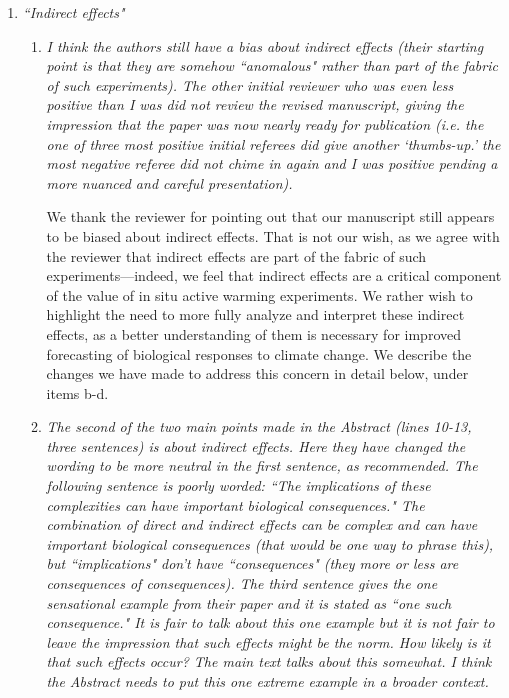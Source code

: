 \documentclass[11pt,a4paper]{letter}
\begin{document}
\begin{letter}{}
\begin{enumerate}
\begin{enumerate}
\end{enumerate}
\item \emph{``Indirect effects"}
\begin{enumerate}
\item \emph{ I think the authors still have a bias about indirect effects (their starting
point is that they are somehow ``anomalous" rather than part of the
fabric of such experiments). The other initial reviewer who was even
less positive than I was did not review the revised manuscript, giving the
impression that the paper was now nearly ready for publication (i.e. the
one of three most positive initial referees did give another `thumbs-up.'
the most negative referee did not chime in again and I was positive
pending a more nuanced and careful presentation).}

\par We thank the reviewer for pointing out that our manuscript still appears to be biased about indirect effects. That is not our wish, as we agree with the reviewer that indirect effects are part of the fabric of such experiments---indeed, we feel that indirect effects are a critical component of the value of in situ active  warming experiments. 
We rather wish to highlight the need to more fully analyze and interpret these indirect effects, as a better understanding of them is necessary for improved forecasting of biological responses to climate change. We describe the changes we have made to address this concern in detail below, under items b-d.

\item \emph{The second of the two main points made in the Abstract (lines 10-13,
three sentences) is about indirect effects. Here they have changed the
wording to be more neutral in the first sentence, as recommended. The
following sentence is poorly worded: ``The implications of these
complexities can have important biological consequences." The
combination of direct and indirect effects can be complex and can have
important biological consequences (that would be one way to phrase
this), but ``implications" don't have ``consequences" (they more or less
are consequences of consequences). The third sentence gives the one
sensational example from their paper and it is stated as ``one such
consequence." It is fair to talk about this one example but it is not fair to
leave the impression that such effects might be the norm. How likely is
it that such effects occur? The main text talks about this somewhat. I
think the Abstract needs to put this one extreme example in a broader
context.}\\


\end{enumerate}
\end{enumerate}
\end{letter}
\end{document}

